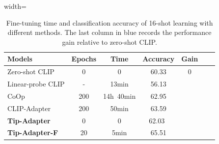 \documentclass[10pt,twocolumn,letterpaper]{article}
\begin{document}
\begin{table}[t]
\centering
\vspace*{13pt}
\begin{adjustbox}{width=\linewidth}
	\begin{tabular}{lcccccc}
	\toprule
		Models & Epochs & Time &  Accuracy &Gain\\ \midrule
		Zero-shot CLIP\cite{radford2021learning} &0 &0 &60.33 &0\\
		Linear-probe CLIP\cite{radford2021learning} & - & 13min & 56.13 &\color{blue}{-4.20}\\
		CoOp\cite{zhou2021coop} & 200 &14h\ 40min & 62.95  &\color{blue}{+2.62}\\
		CLIP-Adapter\cite{gao2021clip} & 200 & 50min & 63.59 &\color{blue}{+3.26}\\
		\textbf{Tip-Adapter} & 0 & 0 & 62.03\ & \color{blue}{+1.70}\\
	    \textbf{Tip-Adapter-F} & 20 & 5min & 65.51 & \color{blue}{+5.18}\\
	\bottomrule
	\end{tabular}
\end{adjustbox}
\caption{Fine-tuning time and classification accuracy of 16-shot learning with different methods. The last column in blue records the performance gain relative to zero-shot CLIP.}
\vspace*{-12pt}
\label{time}
\end{table}
\end{document}
